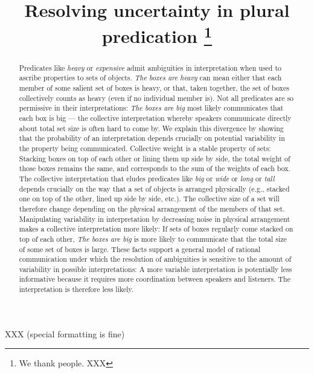 \documentclass[linguex]{sp}
\title[Resolving uncertainty in plural predication]{Resolving uncertainty in plural predication \thanks{We thank people. XXX}}
\author[Scontras \& Goodman]{%
	\spauthor{Gregory Scontras \\ \institute{Stanford University}} \AND
	\spauthor{Noah D.~Goodman \\ \institute{Stanford University}}
}
\begin{document}
\maketitle

\begin{abstract}
	Predicates like \textit{heavy} or \textit{expensive} admit ambiguities in interpretation when used to ascribe properties to sets of objects. \textit{The boxes are heavy} can mean either that each member of some salient set of boxes is heavy, or that, taken together, the set of boxes collectively counts as heavy (even if no individual member is). Not all predicates are so permissive in their interpretations: \textit{The boxes are big} most likely communicates that each box is big --- the collective interpretation whereby speakers communicate directly about total set size is often hard to come by. We explain this divergence by showing that the probability of an interpretation depends crucially on potential variability in the property being communicated. Collective weight is a stable property of sets: Stacking boxes on top of each other or lining them up side by side, the total weight of those boxes remains the same, and corresponds to the sum of the weights of each box. The collective interpretation that eludes predicates like \textit{big} or \textit{wide} or \textit{long} or \textit{tall} depends crucially on the way that a set of objects is arranged physically (e.g., stacked one on top of the other, lined up side by side, etc.). The collective size of a set will therefore change depending on the physical arrangement of the members of that set. Manipulating variability in interpretation by decreasing noise in physical arrangement makes a collective interpretation more likely: If sets of boxes regularly come stacked on top of each other, \textit{The boxes are big} is more likely to communicate that the total size of some set of boxes is large. These facts support a general model of rational communication under which the resolution of ambiguities is sensitive to the amount of variability in possible interpretations: A more variable interpretation is potentially less informative because it requires more coordination between speakers and listeners. The interpretation is therefore less likely.
\end{abstract}

\begin{keywords}
	XXX (special formatting is fine)
\end{keywords}

\newpage
\end{document}
